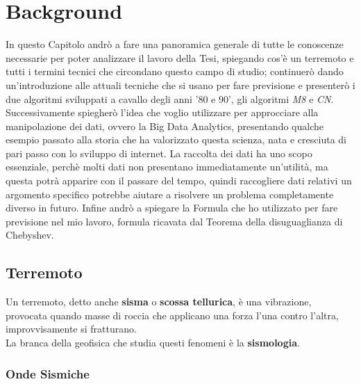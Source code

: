 \chapter{Background}\label{background}

In questo Capitolo andr\`o a fare una panoramica generale di tutte le conoscenze necessarie per poter analizzare il lavoro della Tesi, spiegando cos'\`e un terremoto e tutti i termini tecnici che circondano questo campo di studio; continuer\`o dando un'introduzione alle attuali tecniche che si usano per fare previsione e presenter\`o i due algoritmi sviluppati a cavallo degli anni '80 e 90', gli algoritmi \textit{M8} e \textit{CN}. Successivamente spiegher\`o l'idea che voglio utilizzare per approcciare alla manipolazione dei dati, ovvero la Big Data Analytics, presentando qualche esempio passato alla storia che ha valorizzato questa scienza, nata e cresciuta di pari passo con lo sviluppo di internet. La raccolta dei dati ha uno scopo essenziale, perch\`e molti dati non presentano immediatamente un'utilit\`a, ma questa potr\`a apparire con il passare del tempo, quindi raccogliere dati relativi un argomento specifico potrebbe aiutare a risolvere un problema completamente diverso in futuro. Infine andr\`o a spiegare la Formula che ho utilizzato per fare previsione nel mio lavoro, formula ricavata dal Teorema della disuguaglianza di Chebyshev.

\section{Terremoto}\label{terremoto}
Un terremoto, detto anche \textbf{sisma} o \textbf{scossa tellurica}, \`e una vibrazione, provocata quando masse di roccia che applicano una forza l'una contro l'altra, improvvisamente si fratturano.\\
La branca della geofisica che studia questi fenomeni \`e la \textbf{sismologia}.

\subsection{Onde Sismiche}

